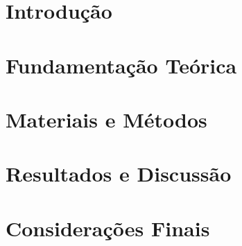 \documentclass[mestrado,qualificacao]{packages/ppg}
\begin{document}


\textual

\chapter{Introdução}
\label{chp:introducao}


\chapter{Fundamentação Teórica}
\label{chp:fundamentacao-teorica}


\chapter{Materiais e Métodos}
\label{chp:materiais-metodos}


\chapter{Resultados e Discussão}
\label{chp:resultados}


\chapter{Considerações Finais}
\label{chp:consideracoes-finais}


\postextual

\printbibliography[title={REFERÊNCIAS}]

\printglossary
\end{document}
